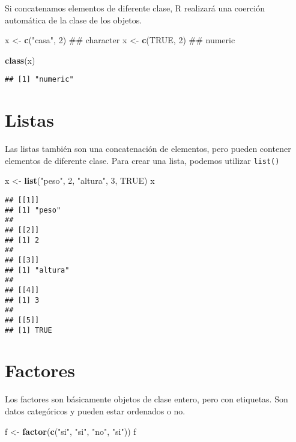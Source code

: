 \documentclass[spanish,]{book}
\newenvironment{Shaded}{\begin{snugshade}}{\end{snugshade}}
\newcommand{\KeywordTok}[1]{\textcolor[rgb]{0.13,0.29,0.53}{\textbf{#1}}}
\newcommand{\DecValTok}[1]{\textcolor[rgb]{0.00,0.00,0.81}{#1}}
\newcommand{\StringTok}[1]{\textcolor[rgb]{0.31,0.60,0.02}{#1}}
\newcommand{\OtherTok}[1]{\textcolor[rgb]{0.56,0.35,0.01}{#1}}
\newcommand{\NormalTok}[1]{#1}
\begin{document}
Si concatenamos elementos de diferente clase, R realizará una coerción
automática de la clase de los objetos.

\begin{Shaded}
\begin{Highlighting}[]
\NormalTok{x <-}\StringTok{ }\KeywordTok{c}\NormalTok{(}\StringTok{"casa"}\NormalTok{, }\DecValTok{2}\NormalTok{) ## character}
\NormalTok{x <-}\StringTok{ }\KeywordTok{c}\NormalTok{(}\OtherTok{TRUE}\NormalTok{, }\DecValTok{2}\NormalTok{) ## numeric}

\KeywordTok{class}\NormalTok{(x)}
\end{Highlighting}
\end{Shaded}

\begin{verbatim}
## [1] "numeric"
\end{verbatim}

\section{Listas}\label{listas}

Las listas también son una concatenación de elementos, pero pueden
contener elementos de diferente clase. Para crear una lista, podemos
utilizar \texttt{list()}

\begin{Shaded}
\begin{Highlighting}[]
\NormalTok{x <-}\StringTok{ }\KeywordTok{list}\NormalTok{(}\StringTok{"peso"}\NormalTok{, }\DecValTok{2}\NormalTok{, }\StringTok{"altura"}\NormalTok{, }\DecValTok{3}\NormalTok{, }\OtherTok{TRUE}\NormalTok{)}
\NormalTok{x}
\end{Highlighting}
\end{Shaded}

\begin{verbatim}
## [[1]]
## [1] "peso"
## 
## [[2]]
## [1] 2
## 
## [[3]]
## [1] "altura"
## 
## [[4]]
## [1] 3
## 
## [[5]]
## [1] TRUE
\end{verbatim}

\section{Factores}\label{factores}

Los factores son básicamente objetos de clase entero, pero con
etiquetas. Son datos categóricos y pueden estar ordenados o no.

\begin{Shaded}
\begin{Highlighting}[]
\NormalTok{f <-}\StringTok{ }\KeywordTok{factor}\NormalTok{(}\KeywordTok{c}\NormalTok{(}\StringTok{"si"}\NormalTok{, }\StringTok{"si"}\NormalTok{, }\StringTok{"no"}\NormalTok{, }\StringTok{"si"}\NormalTok{))}
\NormalTok{f}
\end{Highlighting}
\end{Shaded}
\end{document}

